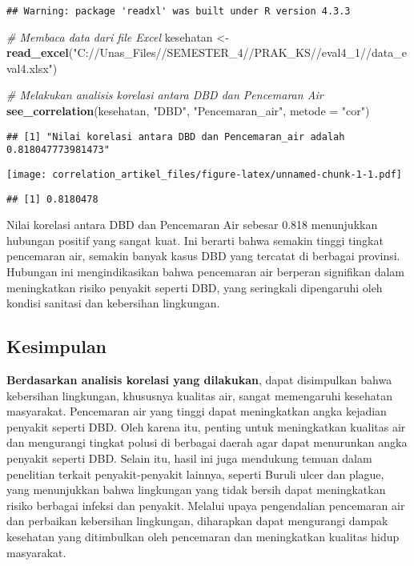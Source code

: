\documentclass[
]{article}
\newenvironment{Shaded}{\begin{snugshade}}{\end{snugshade}}
\newcommand{\AttributeTok}[1]{\textcolor[rgb]{0.13,0.29,0.53}{#1}}
\newcommand{\CommentTok}[1]{\textcolor[rgb]{0.56,0.35,0.01}{\textit{#1}}}
\newcommand{\FunctionTok}[1]{\textcolor[rgb]{0.13,0.29,0.53}{\textbf{#1}}}
\newcommand{\NormalTok}[1]{#1}
\newcommand{\OtherTok}[1]{\textcolor[rgb]{0.56,0.35,0.01}{#1}}
\newcommand{\StringTok}[1]{\textcolor[rgb]{0.31,0.60,0.02}{#1}}
\begin{document}
\begin{verbatim}
## Warning: package 'readxl' was built under R version 4.3.3
\end{verbatim}

\begin{Shaded}
\begin{Highlighting}[]
\CommentTok{\# Membaca data dari file Excel}
\NormalTok{kesehatan }\OtherTok{\textless{}{-}} \FunctionTok{read\_excel}\NormalTok{(}\StringTok{"C://Una\textquotesingle{}s\_Files//SEMESTER\_4//PRAK\_KS//eval4\_1//data\_eval4.xlsx"}\NormalTok{)}

\CommentTok{\# Melakukan analisis korelasi antara DBD dan Pencemaran Air}
\FunctionTok{see\_correlation}\NormalTok{(kesehatan, }\StringTok{"DBD"}\NormalTok{, }\StringTok{"Pencemaran\_air"}\NormalTok{, }\AttributeTok{metode =} \StringTok{"cor"}\NormalTok{)}
\end{Highlighting}
\end{Shaded}

\begin{verbatim}
## [1] "Nilai korelasi antara DBD dan Pencemaran_air adalah 0.818047773981473"
\end{verbatim}

\texttt{[image: correlation\_artikel\_files/figure-latex/unnamed-chunk-1-1.pdf]}

\begin{verbatim}
## [1] 0.8180478
\end{verbatim}

Nilai korelasi antara DBD dan Pencemaran Air sebesar 0.818 menunjukkan
hubungan positif yang sangat kuat. Ini berarti bahwa semakin tinggi
tingkat pencemaran air, semakin banyak kasus DBD yang tercatat di
berbagai provinsi. Hubungan ini mengindikasikan bahwa pencemaran air
berperan signifikan dalam meningkatkan risiko penyakit seperti DBD, yang
seringkali dipengaruhi oleh kondisi sanitasi dan kebersihan lingkungan.

\hypertarget{kesimpulan}{%
\subsection{Kesimpulan}\label{kesimpulan}}

\textbf{Berdasarkan analisis korelasi yang dilakukan}, dapat disimpulkan
bahwa kebersihan lingkungan, khususnya kualitas air, sangat memengaruhi
kesehatan masyarakat. Pencemaran air yang tinggi dapat meningkatkan
angka kejadian penyakit seperti DBD. Oleh karena itu, penting untuk
meningkatkan kualitas air dan mengurangi tingkat polusi di berbagai
daerah agar dapat menurunkan angka penyakit seperti DBD. Selain itu,
hasil ini juga mendukung temuan dalam penelitian terkait
penyakit-penyakit lainnya, seperti Buruli ulcer dan plague, yang
menunjukkan bahwa lingkungan yang tidak bersih dapat meningkatkan risiko
berbagai infeksi dan penyakit. Melalui upaya pengendalian pencemaran air
dan perbaikan kebersihan lingkungan, diharapkan dapat mengurangi dampak
kesehatan yang ditimbulkan oleh pencemaran dan meningkatkan kualitas
hidup masyarakat.
\end{document}

